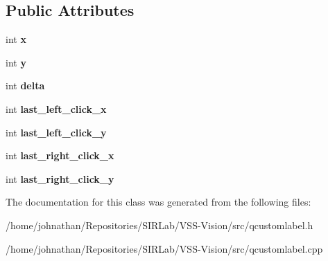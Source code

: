 \subsection*{Public Attributes}
\begin{DoxyCompactItemize}
\item 
int {\bfseries x}\hypertarget{classQCustomLabel_a509c6eb2bc4e80ad72901c1afc976b92}{}\label{classQCustomLabel_a509c6eb2bc4e80ad72901c1afc976b92}

\item 
int {\bfseries y}\hypertarget{classQCustomLabel_a3d3309c76e47ccba7101e5504091804c}{}\label{classQCustomLabel_a3d3309c76e47ccba7101e5504091804c}

\item 
int {\bfseries delta}\hypertarget{classQCustomLabel_a64b5c030bb65139b76f063de1d0784bf}{}\label{classQCustomLabel_a64b5c030bb65139b76f063de1d0784bf}

\item 
int {\bfseries last\+\_\+left\+\_\+click\+\_\+x}\hypertarget{classQCustomLabel_a5fa4f875b266bd86a552867e60be86da}{}\label{classQCustomLabel_a5fa4f875b266bd86a552867e60be86da}

\item 
int {\bfseries last\+\_\+left\+\_\+click\+\_\+y}\hypertarget{classQCustomLabel_abb541cfa1a5ceb23f29bc08573838bcd}{}\label{classQCustomLabel_abb541cfa1a5ceb23f29bc08573838bcd}

\item 
int {\bfseries last\+\_\+right\+\_\+click\+\_\+x}\hypertarget{classQCustomLabel_a7b13426cb8aedd2d0af1d55502d61325}{}\label{classQCustomLabel_a7b13426cb8aedd2d0af1d55502d61325}

\item 
int {\bfseries last\+\_\+right\+\_\+click\+\_\+y}\hypertarget{classQCustomLabel_a85b2496bc41541923c82ef03894885a7}{}\label{classQCustomLabel_a85b2496bc41541923c82ef03894885a7}

\end{DoxyCompactItemize}


The documentation for this class was generated from the following files\+:\begin{DoxyCompactItemize}
\item 
/home/johnathan/\+Repositories/\+S\+I\+R\+Lab/\+V\+S\+S-\/\+Vision/src/qcustomlabel.\+h\item 
/home/johnathan/\+Repositories/\+S\+I\+R\+Lab/\+V\+S\+S-\/\+Vision/src/qcustomlabel.\+cpp\end{DoxyCompactItemize}
